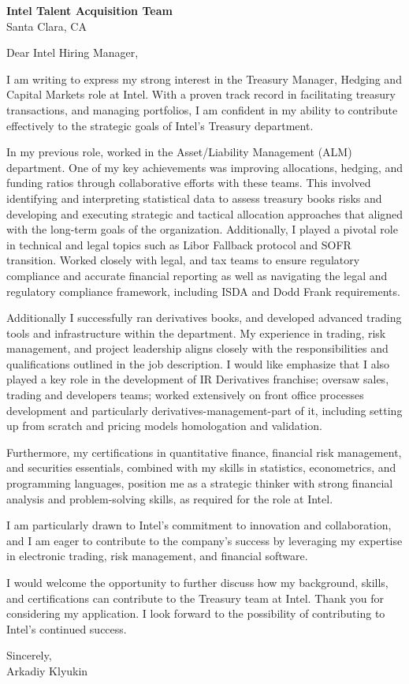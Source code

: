 \documentclass{letter}
\begin{document}
\begin{letter}{\textbf{Intel Talent Acquisition Team} \\
                Santa Clara, CA}


\opening{Dear Intel Hiring Manager,}

I am writing to express my strong interest in the Treasury Manager, Hedging and Capital Markets role at Intel. With a proven track record in facilitating treasury transactions, and managing portfolios, I am confident in my ability to contribute effectively to the strategic goals of Intel's Treasury department.

In my previous role, worked in the Asset/Liability Management (ALM) department. One of my key achievements was improving allocations, hedging, and funding ratios through collaborative efforts with these teams. This involved identifying and interpreting statistical data to assess treasury books risks and developing and executing strategic and tactical allocation approaches that aligned with the long-term goals of the organization. Additionally, I played a pivotal role in technical and legal topics such as Libor Fallback protocol and SOFR transition. Worked closely with legal, and tax teams to ensure regulatory compliance and accurate financial reporting as well as navigating the legal and regulatory compliance framework, including ISDA and Dodd Frank requirements.

Additionally I successfully ran derivatives books, and developed advanced trading tools and infrastructure within the department. My experience in trading, risk management, and project leadership aligns closely with the responsibilities and qualifications outlined in the job description. I would like emphasize that I also played a key role in the development of IR Derivatives franchise; oversaw sales, trading and developers teams; worked extensively on front office processes development and particularly derivatives-management-part of it, including setting up from scratch and pricing models homologation and validation.

Furthermore, my certifications in quantitative finance, financial risk management, and securities essentials, combined with my skills in statistics, econometrics, and programming languages, position me as a strategic thinker with strong financial analysis and problem-solving skills, as required for the role at Intel.

I am particularly drawn to Intel's commitment to innovation and collaboration, and I am eager to contribute to the company's success by leveraging my expertise in electronic trading, risk management, and financial software.

I would welcome the opportunity to further discuss how my background, skills, and certifications can contribute to the Treasury team at Intel. Thank you for considering my application. I look forward to the possibility of contributing to Intel's continued success.

Sincerely,\\
Arkadiy Klyukin
\end{letter}
\end{document}
